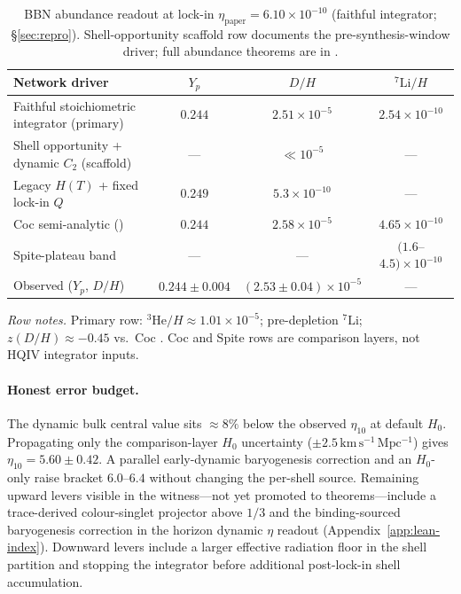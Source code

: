 \documentclass[11pt]{amsart}
\begin{document}
\begin{table}[ht]
\centering
\small
\caption{BBN abundance readout at lock-in $\eta_{\mathrm{paper}}=6.10\times
10^{-10}$ (faithful integrator; \S\ref{sec:repro}). Shell-opportunity
scaffold row documents the pre-synthesis-window driver; full abundance
theorems are in \cite{hqiv-bbn-paper}.}
\label{tab:bbn-methods}
\begin{tabular}{@{}lccc@{}}
\toprule
Network driver & $Y_p$ & $D/H$ & $^7\mathrm{Li}/H$ \\
\midrule
Faithful stoichiometric integrator (primary) &
  $0.244$ & $2.51\times 10^{-5}$ & $2.54\times 10^{-10}$ \\
Shell opportunity + dynamic $C_2$ (scaffold) &
  --- & $\ll 10^{-5}$ & --- \\
Legacy $H(T)$ + fixed lock-in $Q$ & $0.249$ & $5.3\times 10^{-10}$ & --- \\
\midrule
Coc semi-analytic (\cite{coc2015}) & $0.244$ & $2.58\times 10^{-5}$ &
  $4.65\times 10^{-10}$ \\
Spite-plateau band & --- & --- & $(1.6$--$4.5)\times 10^{-10}$ \\
\midrule
Observed ($Y_p$, $D/H$) & $0.244\pm 0.004$ &
  $(2.53\pm 0.04)\times 10^{-5}$ & --- \\
\bottomrule
\end{tabular}

\medskip
\footnotesize
\emph{Row notes.} Primary row: $^3\mathrm{He}/H\approx 1.01\times 10^{-5}$;
pre-depletion $^7\mathrm{Li}$; $z(D/H)\approx -0.45$ vs.\ Coc \cite{coc2015}.
Coc and Spite rows are comparison layers, not HQIV integrator inputs.
\end{table}

\paragraph{Honest error budget.}
The dynamic bulk central value sits $\approx 8\%$ below the observed
$\eta_{10}$ at default $H_0$. Propagating only the comparison-layer
$H_0$ uncertainty ($\pm 2.5\,\mathrm{km\,s^{-1}\,Mpc^{-1}}$) gives
$\eta_{10}=5.60\pm 0.42$. A parallel early-dynamic baryogenesis
correction and an $H_0$-only raise bracket $6.0$--$6.4$ without
changing the per-shell source. Remaining upward levers visible in the
witness---not yet promoted to theorems---include a
trace-derived colour-singlet projector above $1/3$ and the binding-sourced
baryogenesis correction in the horizon dynamic $\eta$ readout
(Appendix~\ref{app:lean-index}). Downward levers include a larger
effective radiation floor in the shell partition and stopping the
integrator before additional post-lock-in shell accumulation.
\end{document}
